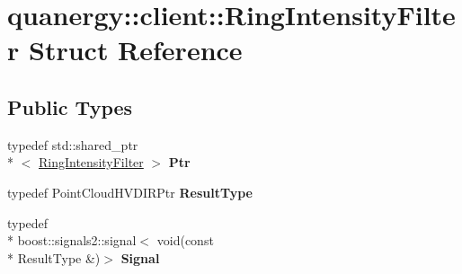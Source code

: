 \hypertarget{structquanergy_1_1client_1_1RingIntensityFilter}{\section{quanergy\-:\-:client\-:\-:Ring\-Intensity\-Filter Struct Reference}
\label{structquanergy_1_1client_1_1RingIntensityFilter}
}
\subsection*{Public Types}
\begin{DoxyCompactItemize}
\item 
\hypertarget{structquanergy_1_1client_1_1RingIntensityFilter_afa4e8d4876b188636c17907094f54d62}{typedef std\-::shared\-\_\-ptr\\*
$<$ \hyperlink{structquanergy_1_1client_1_1RingIntensityFilter}{Ring\-Intensity\-Filter} $>$ {\bfseries Ptr}}\label{structquanergy_1_1client_1_1RingIntensityFilter_afa4e8d4876b188636c17907094f54d62}

\item 
\hypertarget{structquanergy_1_1client_1_1RingIntensityFilter_a96b133d31719924d92f567ee44056f9e}{typedef Point\-Cloud\-H\-V\-D\-I\-R\-Ptr {\bfseries Result\-Type}}\label{structquanergy_1_1client_1_1RingIntensityFilter_a96b133d31719924d92f567ee44056f9e}

\item 
\hypertarget{structquanergy_1_1client_1_1RingIntensityFilter_a33b71b3190f08792388ac6e37767f247}{typedef \\*
boost\-::signals2\-::signal$<$ void(const \\*
Result\-Type \&)$>$ {\bfseries Signal}}\label{structquanergy_1_1client_1_1RingIntensityFilter_a33b71b3190f08792388ac6e37767f247}

\end{DoxyCompactItemize}
